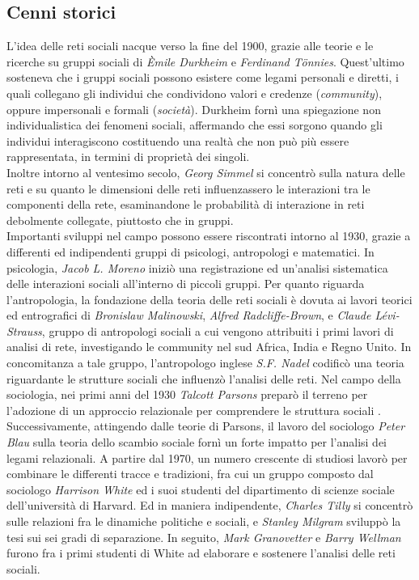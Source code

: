 \subsection{Cenni storici}
L'idea delle reti sociali nacque verso la fine del 1900, grazie alle teorie e le ricerche su gruppi sociali di \textit{\`Emile Durkheim} e \textit{Ferdinand T\"{o}nnies}. Quest'ultimo sosteneva che i gruppi sociali possono esistere come legami personali e diretti, i quali collegano gli individui che condividono valori e credenze (\emph{community}), oppure impersonali e formali (\emph{società})\cite{tonnies}. Durkheim fornì una spiegazione non individualistica dei fenomeni sociali, affermando che essi sorgono quando gli individui interagiscono costituendo una realtà che non può più essere rappresentata, in termini di proprietà dei singoli\cite{durkheim}.
\\
Inoltre intorno al ventesimo secolo, \emph{Georg Simmel} si concentrò sulla natura delle reti e su quanto le dimensioni delle reti influenzassero le interazioni tra le componenti della rete, esaminandone le probabilità di interazione in reti debolmente collegate, piuttosto che in gruppi\cite{simmel}.
\\
Importanti sviluppi nel campo possono essere riscontrati intorno al 1930, grazie a differenti ed indipendenti gruppi di psicologi, antropologi e matematici. In psicologia, \emph{Jacob L. Moreno} iniziò una registrazione ed un'analisi sistematica delle interazioni sociali all'interno di piccoli gruppi. Per quanto riguarda l'antropologia, la fondazione della teoria delle reti sociali è dovuta ai lavori teorici ed entrografici di \emph{Bronislaw Malinowski}\cite{bronislaw}, \emph{Alfred Radcliffe-Brown}\cite{brown1, brown2}, e \emph{Claude Lévi-Strauss}\cite{strauss}, gruppo di antropologi sociali a cui vengono attribuiti i primi lavori di analisi di rete, investigando le community nel sud Africa, India e Regno Unito. In concomitanza a tale gruppo, l'antropologo inglese \emph{S.F. Nadel} codificò una teoria riguardante le strutture sociali che influenzò l'analisi delle reti\cite{nadel}. Nel campo della sociologia, nei primi anni del 1930 \emph{Talcott Parsons} preparò il terreno per l'adozione di un approccio relazionale per comprendere le struttura sociali \cite{parsons1, parsons2}. Successivamente, attingendo dalle teorie di Parsons, il lavoro del sociologo \emph{Peter Blau} sulla teoria dello scambio sociale fornì un forte impatto per l'analisi dei legami relazionali\cite{blau1,blau2,blau3}. A partire dal 1970, un numero crescente di studiosi lavorò per combinare le differenti tracce e tradizioni, fra cui un gruppo composto dal sociologo \emph{Harrison White} ed i suoi studenti del dipartimento di scienze sociale dell'università di Harvard. Ed in maniera indipendente, \emph{Charles Tilly} si concentrò sulle relazioni fra le dinamiche politiche e sociali, e \emph{Stanley Milgram} sviluppò la tesi sui sei gradi di separazione\cite{bernie}. In seguito, \emph{Mark Granovetter}\cite{grano} e \emph{Barry Wellman}\cite{wellman} furono fra i primi studenti di White ad elaborare e sostenere l'analisi delle reti sociali\cite{mullins, tillyc, wellman2}.

